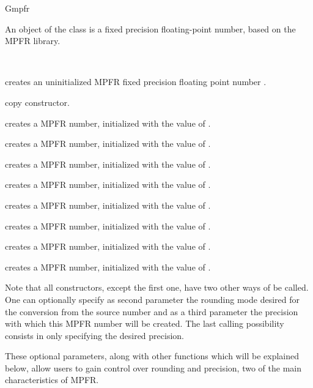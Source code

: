 \begin{ccRefClass} {Gmpfr}
\label{Gmpfr}

\ccDefinition

An object of the class  is a fixed precision
floating-point number, based on the MPFR library.


\ccIsModel
{}\\

\ccTypes


\ccCreation
{}

	{creates an uninitialized MPFR fixed precision floating point number
	\ccVar.}

\ccHidden {}
	{copy constructor.}

	{creates a MPFR number, initialized with the value of .}

	{creates a MPFR number, initialized with the value of .}

	{creates a MPFR number, initialized with the value of .}

	{creates a MPFR number, initialized with the value of .}

	{creates a MPFR number, initialized with the value of .}

	{creates a MPFR number, initialized with the value of .}

	{creates a MPFR number, initialized with the value of .}

	{creates a MPFR number, initialized with the value of .}

Note that all constructors, except the first one, have two other ways
of be called.
One can optionally specify as second parameter the rounding mode desired
for the conversion from the source number and as a third parameter the
precision with which this MPFR number will be created.
The last calling possibility consists in only specifying the desired
precision.

These optional parameters, along with other functions which will be
explained below, allow users to gain control over rounding and precision,
two of the main characteristics of MPFR.



\end{ccRefClass}
